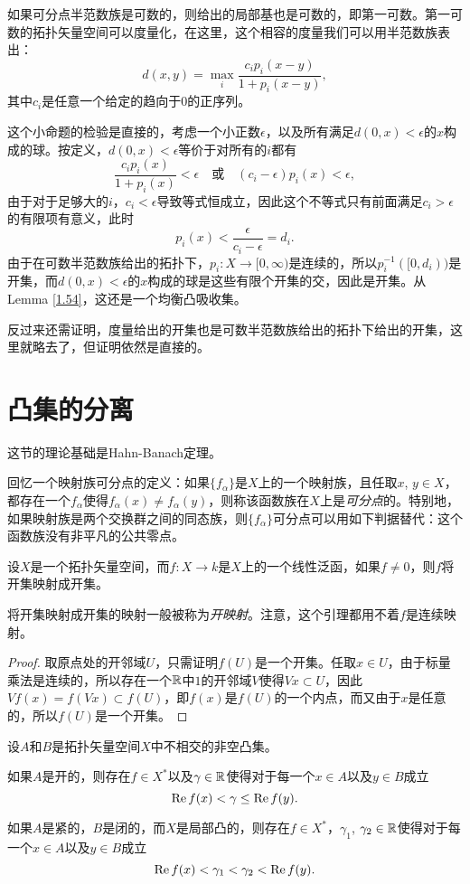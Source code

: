 如果可分点半范数族是可数的，则给出的局部基也是可数的，即第一可数。第一可数的拓扑矢量空间可以度量化，在这里，这个相容的度量我们可以用半范数族表出：
\[
	d(x,y)=\max_i \frac{c_i p_i(x-y)}{1+p_i(x-y)},
\]
其中$c_i$是任意一个给定的趋向于$0$的正序列。

这个小命题的检验是直接的，考虑一个小正数$\epsilon$，以及所有满足$d(0,x)<\epsilon$的$x$构成的球。按定义，$d(0,x)<\epsilon$等价于对所有的$i$都有
\[
	\frac{c_i p_i(x)}{1+p_i(x)}<\epsilon\quad\text{或}\quad (c_i-\epsilon)p_i(x)<\epsilon,
\]
由于对于足够大的$i$，$c_i<\epsilon$导致等式恒成立，因此这个不等式只有前面满足$c_i>\epsilon$的有限项有意义，此时
\[
	p_i(x)<\frac{\epsilon}{c_i-\epsilon}=d_i.
\]
由于在可数半范数族给出的拓扑下，$p_i:X\to [0,\infty)$是连续的，所以$p_i^{-1}([0,d_i))$是开集，而$d(0,x)<\epsilon$的$x$构成的球是这些有限个开集的交，因此是开集。从Lemma \ref{1.54}，这还是一个均衡凸吸收集。

反过来还需证明，度量给出的开集也是可数半范数族给出的拓扑下给出的开集，这里就略去了，但证明依然是直接的。
\section{凸集的分离}

这节的理论基础是Hahn-Banach定理。

回忆一个映射族可分点的定义：如果$\{f_\alpha\}$是$X$上的一个映射族，且任取$x$, $y\in X$，都存在一个$f_\alpha$使得$f_\alpha(x)\neq f_\alpha(y)$，则称该函数族在$X$上是\textit{可分点}的。特别地，如果映射族是两个交换群之间的同态族，则$\{f_\alpha\}$可分点可以用如下判据替代：这个函数族没有非平凡的公共零点。

\begin{lem}
	设$X$是一个拓扑矢量空间，而$f:X \to k$是$X$上的一个线性泛函，如果$f\neq 0$，则$f$将开集映射成开集。
\end{lem}

将开集映射成开集的映射一般被称为\textit{开映射}。注意，这个引理都用不着$f$是连续映射。

\begin{proof}
	取原点处的开邻域$U$，只需证明$f(U)$是一个开集。任取$x\in U$，由于标量乘法是连续的，所以存在一个$\mathbb{R}$中$1$的开邻域$V$使得$Vx\subset U$，因此$V f(x)=f(Vx)\subset f(U)$，即$f(x)$是$f(U)$的一个内点，而又由于$x$是任意的，所以$f(U)$是一个开集。
\end{proof}

\begin{thm}\label{thm:1.33}
	设$A$和$B$是拓扑矢量空间$X$中不相交的非空凸集。
	\begin{compactenum}[(a)]
	\item 如果$A$是开的，则存在$f\in X^*$以及$\gamma\in \mathbb{R}$使得对于每一个$x\in A$以及$y\in B$成立
	\[
		\operatorname{Re} f(x)<\gamma \leq \operatorname{Re} f(y).
	\]
	\item 如果$A$是紧的，$B$是闭的，而$X$是局部凸的，则存在$f\in X^*$，$\gamma_1$, $\gamma_2\in\mathbb{R}$使得对于每一个$x\in A$以及$y\in B$成立
	\[
		\operatorname{Re} f(x)<\gamma_1<\gamma_2<\operatorname{Re} f(y).
	\]
	\end{compactenum}
\end{thm}

